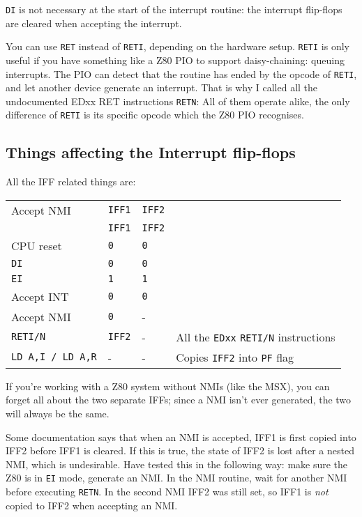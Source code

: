 \documentclass[12pt,twoside,openright,a4paper]{book}
\begin{document}
{\tt DI} is not necessary at the start of the interrupt routine: the interrupt flip-flops are cleared when accepting the interrupt.

You can use {\tt RET} instead of {\tt RETI}, depending on the hardware setup. {\tt RETI} is only useful if you have something like a Z80 PIO to support daisy-chaining: queuing interrupts. The PIO can detect that the routine has ended by the opcode of {\tt RETI}, and let another device generate an interrupt. That is why I called all the undocumented EDxx RET instructions {\tt RETN}: All of them operate alike, the only difference of {\tt RETI} is its specific opcode which the Z80 PIO recognises.


\subsection{Things affecting the Interrupt flip-flops}
\label{flipflop}

All the IFF related things are:

\begin{tabular}{llll}
	Accept NMI	& {\tt IFF1}	& {\tt IFF2} \\
				& {\tt IFF1}	& {\tt IFF2} \\
	CPU reset	& {\tt 0}		& {\tt 0}\\
	{\tt DI}	& {\tt 0}		& {\tt 0}\\
	{\tt EI}	& {\tt 1}		& {\tt 1}\\
	Accept INT	& {\tt 0}		& {\tt 0}\\
	Accept NMI	& {\tt 0}		& -\\
	{\tt RETI/N}& {\tt IFF2}	& - & All the {\tt EDxx} {\tt RETI/N} instructions\\
	{\tt LD A,I / LD A,R} & - & - & Copies {\tt IFF2} into {\tt PF} flag
\end{tabular}

If you're working with a Z80 system without NMIs (like the MSX), you can forget all about the two separate IFFs; since a NMI isn't ever generated, the two will always be the same. 

Some documentation says that when an NMI is accepted, IFF1 is first copied into IFF2 before IFF1 is cleared. If this is true, the state of IFF2 is lost after a nested NMI, which is undesirable. Have tested this in the following way: make sure the Z80 is in {\tt EI} mode, generate an NMI. In the NMI routine, wait for another NMI before executing {\tt RETN}. In the second NMI IFF2 was still set, so IFF1 is {\em not} copied to IFF2 when accepting an NMI.
\end{document}
